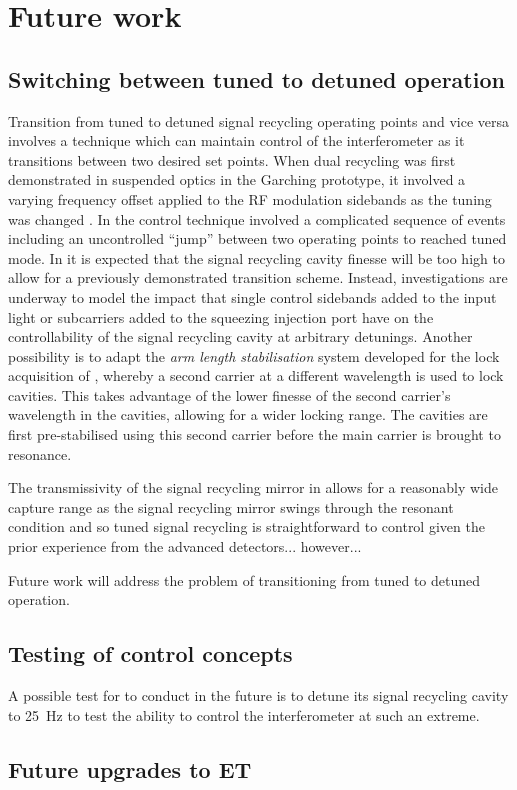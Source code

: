 \section{Future work}

\subsection{Switching between tuned to detuned operation}
Transition from tuned to detuned signal recycling operating points and vice versa involves a technique which can maintain control of the interferometer as it transitions between two desired set points. When dual recycling was first demonstrated in suspended optics in the Garching prototype, it involved a varying frequency offset applied to the \gls{RF} modulation sidebands as the tuning was changed \cite{Freise2000}. In \GEO{} the control technique involved a complicated sequence of events \cite{Grote2004} including an uncontrolled ``jump'' between two operating points \cite{Hild2007} to reached tuned mode. In \ETLF{} it is expected that the signal recycling cavity finesse will be too high to allow for a previously demonstrated transition scheme. Instead, investigations are underway to model the impact that single control sidebands added to the input light or subcarriers added to the squeezing injection port have on the controllability of the signal recycling cavity at arbitrary detunings. Another possibility is to adapt the \emph{arm length stabilisation} system developed for the lock acquisition of \ALIGO{} \cite{Mullavey2012, Staley2014}, whereby a second carrier at a different wavelength is used to lock cavities. This takes advantage of the lower finesse of the second carrier's wavelength in the cavities, allowing for a wider locking range. The cavities are first pre-stabilised using this second carrier before the main carrier is brought to resonance.

The transmissivity of the signal recycling mirror in \ETLF{} allows for a reasonably wide capture range as the signal recycling mirror swings through the resonant condition and so tuned signal recycling is straightforward to control given the prior experience from the advanced detectors... however...

Future work will address the problem of transitioning \ETLF{} from tuned to detuned operation.

\subsection{Testing of control concepts}
A possible test for \GEOHF{} to conduct in the future is to detune its signal recycling cavity to \SI{25}{\hertz} to test the ability to control the interferometer at such an extreme.

\subsection{Future upgrades to ET}
